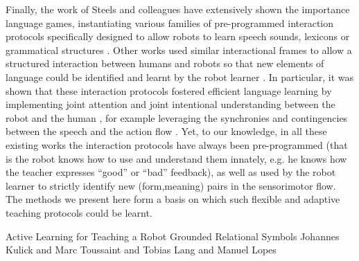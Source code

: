 Finally, the work of Steels and colleagues \cite{steels2012grounding,steels2002aibos} have extensively shown the importance language games, instantiating various families of pre-programmed interaction protocols specifically designed to allow robots to learn speech sounds\cite{de2000self,oudeyer2006self}, lexicons \cite{steels2002aibos} or grammatical structures \cite{steels06spatialLanguage, steels2008can}. Other works used similar interactional frames to allow a structured interaction between humans and robots so that new elements of language could be identified and learnt by the robot learner \cite{roy02a,lyon2012interactive,cangelosi06b,yu2004multimodal,cangelosi2010integration,sugita05a,dominey2005learning,cederborg2011imitating}. In particular, it was shown that these interaction protocols fostered efficient language learning by implementing joint attention and joint intentional understanding between the robot and the human \cite{kaplan2006challenges,yu2005role,yu2007unified}, for example leveraging the synchronies and contingencies between the speech and the action flow \cite{rohlfing2006can,schillingmann2011acoustic}. Yet, to our knowledge, in all these existing works the interaction protocols have always been pre-programmed (that is the robot knows how to use and understand them innately, e.g. he knows how the teacher expresses ``good'' or ``bad'' feedback), as well as used by the robot learner to strictly identify new (form,meaning) pairs in the sensorimotor flow. The methods we present here form a basis on which such flexible and adaptive teaching protocols could be learnt.


Active Learning for Teaching a Robot Grounded Relational Symbols
Johannes Kulick and Marc Toussaint and
Tobias Lang
and
Manuel Lopes



